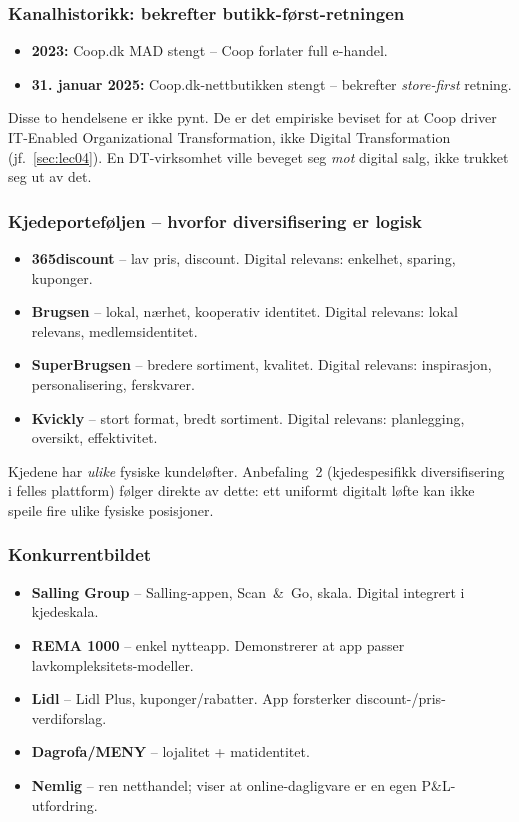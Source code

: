 \subsubsection*{Kanalhistorikk: bekrefter butikk-først-retningen}
\begin{itemize}
  \item \textbf{2023:} Coop.dk MAD stengt -- Coop forlater full e-handel.
  \item \textbf{31. januar 2025:} Coop.dk-nettbutikken stengt -- bekrefter
    \emph{store-first} retning.
\end{itemize}
Disse to hendelsene er ikke pynt. De er det empiriske beviset for at Coop
driver IT-Enabled Organizational Transformation, ikke Digital
Transformation (jf.\ \autoref{sec:lec04}). En DT-virksomhet ville beveget
seg \emph{mot} digital salg, ikke trukket seg ut av det.

\subsubsection*{Kjedeporteføljen -- hvorfor diversifisering er logisk}
\begin{itemize}
  \item \textbf{365discount} -- lav pris, discount. Digital relevans:
    enkelhet, sparing, kuponger.
  \item \textbf{Brugsen} -- lokal, nærhet, kooperativ identitet. Digital
    relevans: lokal relevans, medlemsidentitet.
  \item \textbf{SuperBrugsen} -- bredere sortiment, kvalitet. Digital
    relevans: inspirasjon, personalisering, ferskvarer.
  \item \textbf{Kvickly} -- stort format, bredt sortiment. Digital
    relevans: planlegging, oversikt, effektivitet.
\end{itemize}
Kjedene har \emph{ulike} fysiske kundeløfter. Anbefaling~2 (kjedespesifikk
diversifisering i felles plattform) følger direkte av dette: ett uniformt
digitalt løfte kan ikke speile fire ulike fysiske posisjoner.

\subsubsection*{Konkurrentbildet}
\begin{itemize}
  \item \textbf{Salling Group} -- Salling-appen, Scan~\&~Go, skala. Digital
    integrert i kjedeskala.
  \item \textbf{REMA 1000} -- enkel nytteapp. Demonstrerer at app passer
    lavkompleksitets-modeller.
  \item \textbf{Lidl} -- Lidl Plus, kuponger/rabatter. App forsterker
    discount-/pris-verdiforslag.
  \item \textbf{Dagrofa/MENY} -- lojalitet + matidentitet.
  \item \textbf{Nemlig} -- ren netthandel; viser at online-dagligvare er
    en egen P\&L-utfordring.
\end{itemize}

